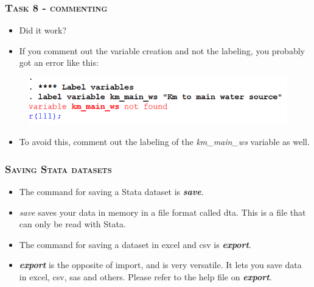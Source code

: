 \documentclass[10pt]{beamer}
\begin{document}
		
	\begin{frame}
		\frametitle{\textsc{Task 8 - commenting}}

		\begin{itemize}	
			\item Did it work? 

			\item If you comment out the variable creation and not the labeling, you probably got an error like this:
		\end{itemize}
		\begin{figure}[H] 
			\centering
			\includegraphics[width=0.9\linewidth]{error}
		\end{figure}
		\begin{itemize}
			\item To avoid this, comment out the labeling of the \textit{km\_main\_ws} variable as well. 
		\end{itemize}

	\end{frame}
			
	\begin{frame}
	\frametitle{\textsc{Saving Stata datasets}}	
		\begin{itemize}
			\item The command for saving a Stata dataset is \textit{\textbf{save}}.
			\item \textit{save} saves your data in memory in a file format called dta. 
				  This is a file that can only be read with Stata.
			\item The command for saving a dataset in excel and csv is \textit{\textbf{export}}.
			\item \textit{\textbf{export}} is the opposite of import, and is very versatile. 
				  It lets you save data in excel, csv, sas and others. 
				  Please refer to the help file on \textit{\textbf{export}}.
		\end{itemize}	
	\end{frame}
\end{document}
